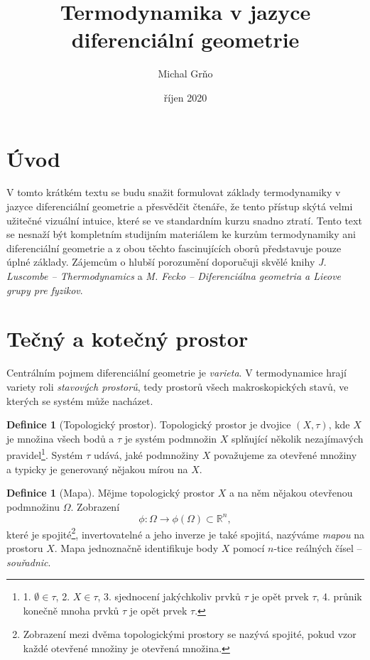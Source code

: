 \documentclass{article}
\title{Termodynamika v jazyce diferenciální geometrie}
\author{Michal Grňo}
\date{říjen 2020}
\theoremstyle{definition}
\newtheorem{definition}[theorem]{Definice}
\newcommand{\R}{\mathbb{R}}
\begin{document}
\maketitle

\section{Úvod}
V tomto krátkém textu se budu snažit formulovat základy termodynamiky v jazyce diferenciální geometrie a přesvědčit čtenáře, že tento přístup skýtá velmi užitečné vizuální intuice, které se ve standardním kurzu snadno ztratí. Tento text se nesnaží být kompletním studijním materiálem ke kurzům termodynamiky ani diferenciální geometrie a z obou těchto fascinujících oborů představuje pouze úplné základy. Zájemcům o hlubší porozumění doporučuji skvělé knihy \textit{J. Luscombe – Thermodynamics} a \textit{M. Fecko – Diferenciálna geometria a Lieove grupy pre fyzikov}.

\section{Tečný a kotečný prostor}
Centrálním pojmem diferenciální geometrie je \textit{varieta}. V termodynamice hrají variety roli \textit{stavových prostorů}, tedy prostorů všech makroskopických stavů, ve kterých se systém může nacházet.

\begin{definition}[Topologický prostor]
Topologický prostor je dvojice $(X, \tau)$, kde $X$ je množina všech bodů a $\tau$ je systém podmnožin $X$ splňující několik nezajímavých pravidel\footnote{1. $\emptyset \in \tau$, 2. $X \in \tau$, 3. sjednocení jakýchkoliv prvků $\tau$ je opět prvek $\tau$, 4. průnik konečně mnoha prvků $\tau$ je opět prvek $\tau$.}. Systém $\tau$ udává, jaké podmnožiny $X$ považujeme za otevřené množiny a typicky je generovaný nějakou mírou na $X$.
\end{definition}

\begin{definition}[Mapa]
Mějme topologický prostor $X$ a na něm nějakou otevřenou podmnožinu $\Omega$. Zobrazení
\begin{equation*}
    \phi: \Omega \to \phi(\Omega) \subset \R^n,
\end{equation*}
které je spojité\footnote{Zobrazení mezi dvěma topologickými prostory se nazývá spojité, pokud vzor každé otevřené množiny je otevřená množina.}, invertovatelné a jeho inverze je také spojitá, nazýváme \textit{mapou} na prostoru $X$. Mapa jednoznačně identifikuje body $X$ pomocí $n$-tice reálných čísel – \textit{souřadnic}.
\end{definition}
\end{document}
